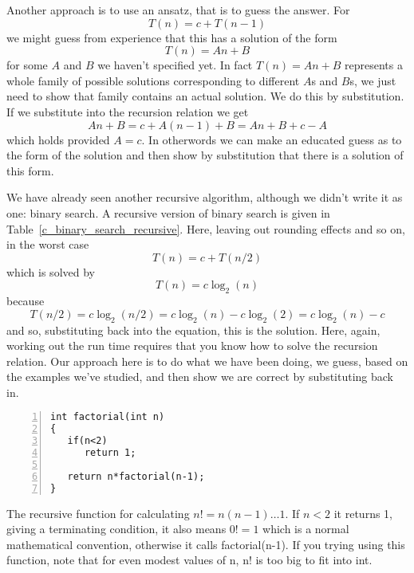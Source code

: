 \documentclass[11pt,a4paper]{scrartcl}
\begin{document}
Another approach is to use an ansatz, that is to guess the answer. For
\begin{equation}
T(n)=c+T(n-1)
\end{equation}
we might guess from experience that this has a solution of the form
\begin{equation}
T(n)=An+B
\end{equation}
for some $A$ and $B$ we haven't specified yet. In fact $T(n)=An+B$
represents a whole family of possible solutions corresponding to different $A$s
and $B$s, we just need to show that family contains an actual solution. We do this by substitution. If we substitute into the recursion relation we get
\begin{equation}
An+B=c+A(n-1)+B=An+B+c-A
\end{equation}
which holds provided $A=c$. In otherwords we can make an educated
guess as to the form of the solution and then show by substitution
that there is a solution of this form.

We have already seen another recursive algorithm, although we didn't
write it as one: binary search. A recursive version of binary search is
given in Table~\ref{c_binary_search_recursive}. Here, leaving out
rounding effects and so on, in the worst case
\begin{equation}
T(n)=c+T(n/2)
\end{equation}
which is solved by 
\begin{equation}
T(n)=c\log_2(n)
\end{equation}
because 
\begin{equation}
T(n/2)=c\log_2(n/2)=c\log_2(n)-c\log_2(2)=c\log_2(n)-c
\end{equation}
and so, substituting back into the equation, this is the solution.
Here, again, working out the run time requires that you know how to
solve the recursion relation. Our approach here is to do what we have
been doing, we guess, based on the examples we've studied, and then
show we are correct by substituting back in.

\begin{table}[b]
\begin{lstlisting}[numbers=left]
int factorial(int n)
{
   if(n<2)
      return 1;

   return n*factorial(n-1);
}

\end{lstlisting}
\caption{The recursive function for calculating $n!=n(n-1)\ldots 1$. If $n<2$ it returns 1, giving a terminating condition, it also means $0!=1$ which is a normal mathematical convention, otherwise it calls factorial(n-1). If you trying using this function, note that for even modest values of n, n! is too big to fit into int.\label{c_factorial}}
\end{table}
\end{document}
